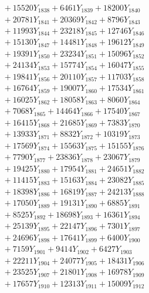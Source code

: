 \documentclass[a4paper,10pt]{article}
\begin{document}
{\begin{align}
&\;  + 15520 Y_{1838} + 6461 Y_{1839} + 18200 Y_{1840} \\[0.3ex]
&\;  + 20781 Y_{1841} + 20369 Y_{1842} + 8796 Y_{1843} \\[0.3ex]
&\;  + 11993 Y_{1844} + 23218 Y_{1845} + 12746 Y_{1846} \\[0.3ex]
&\;  + 15130 Y_{1847} + 14481 Y_{1848} + 19612 Y_{1849} \\[0.3ex]
&\;  + 19391 Y_{1850} + 23234 Y_{1851} + 15096 Y_{1852} \\[0.3ex]
&\;  + 24134 Y_{1853} + 15774 Y_{1854} + 16047 Y_{1855} \\[0.3ex]
&\;  + 19841 Y_{1856} + 20110 Y_{1857} + 11703 Y_{1858} \\[0.5ex]\allowbreak
&\;  + 16764 Y_{1859} + 19007 Y_{1860} + 17534 Y_{1861} \\[0.3ex]
&\;  + 16025 Y_{1862} + 18058 Y_{1863} + 8060 Y_{1864} \\[0.3ex]
&\;  + 7068 Y_{1865} + 14464 Y_{1866} + 17540 Y_{1867} \\[0.3ex]
&\;  + 16415 Y_{1868} + 21685 Y_{1869} + 7383 Y_{1870} \\[0.3ex]
&\;  + 13933 Y_{1871} + 8832 Y_{1872} + 10319 Y_{1873} \\[0.3ex]
&\;  + 17569 Y_{1874} + 15563 Y_{1875} + 15155 Y_{1876} \\[0.3ex]
&\;  + 7790 Y_{1877} + 23836 Y_{1878} + 23067 Y_{1879} \\[0.3ex]
&\;  + 19425 Y_{1880} + 17954 Y_{1881} + 24651 Y_{1882} \\[0.3ex]
&\;  + 11415 Y_{1883} + 15163 Y_{1884} + 23082 Y_{1885} \\[0.3ex]
&\;  + 18398 Y_{1886} + 16819 Y_{1887} + 24213 Y_{1888} \\[0.5ex]\allowbreak
&\;  + 17050 Y_{1889} + 19131 Y_{1890} + 6885 Y_{1891} \\[0.3ex]
&\;  + 8525 Y_{1892} + 18698 Y_{1893} + 16361 Y_{1894} \\[0.3ex]
&\;  + 25139 Y_{1895} + 22147 Y_{1896} + 7301 Y_{1897} \\[0.3ex]
&\;  + 24696 Y_{1898} + 17641 Y_{1899} + 6400 Y_{1900} \\[0.3ex]
&\;  + 7159 Y_{1901} + 9414 Y_{1902} + 6427 Y_{1903} \\[0.3ex]
&\;  + 22211 Y_{1904} + 24077 Y_{1905} + 18431 Y_{1906} \\[0.3ex]
&\;  + 23525 Y_{1907} + 21801 Y_{1908} + 16978 Y_{1909} \\[0.3ex]
&\;  + 17657 Y_{1910} + 12313 Y_{1911} + 15009 Y_{1912} \\[0.3ex]

\end{align}}
\end{document}
